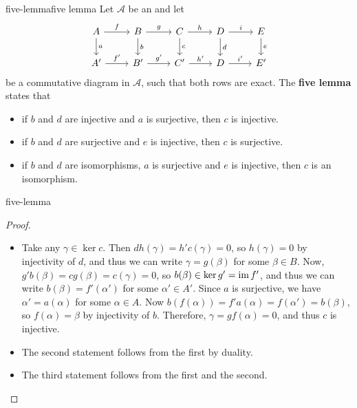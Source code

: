 \begin{topic}{five-lemma}{five lemma}
    Let $\mathcal{A}$ be an  and let
    \[ \svg \begin{tikzcd} A \arrow{r}{f} \arrow{d}{a} & B \arrow{r}{g} \arrow{d}{b} & C \arrow{r}{h} \arrow{d}{c} & D \arrow{r}{i} \arrow{d}{d} & E \arrow{d}{e} \\ A' \arrow{r}{f'} & B' \arrow{r}{g'} & C' \arrow{r}{h'} & D \arrow{r}{i'} & E' \end{tikzcd} \]
    be a commutative diagram in $\mathcal{A}$, such that both rows are exact. The \textbf{five lemma} states that
    \begin{itemize}
        \item if $b$ and $d$ are injective and $a$ is surjective, then $c$ is injective.
        \item if $b$ and $d$ are surjective and $e$ is injective, then $c$ is surjective.
        \item if $b$ and $d$ are isomorphisms, $a$ is surjective and $e$ is injective, then $c$ is an isomorphism.
    \end{itemize}
\end{topic}

\begin{example}{five-lemma}
    \begin{proof}
        \begin{itemize}
            \item Take any $\gamma \in \ker c$. Then $dh(\gamma) = h'c(\gamma) = 0$, so $h(\gamma) = 0$ by injectivity of $d$, and thus we can write $\gamma = g(\beta)$ for some $\beta \in B$. Now, $g'b(\beta) = cg(\beta) = c(\gamma) = 0$, so $b(\beta) \in \ker g' = \operatorname{im} f'$, and thus we can write $b(\beta) = f'(\alpha')$ for some $\alpha' \in A'$. Since $a$ is surjective, we have $\alpha' = a(\alpha)$ for some $\alpha \in A$. Now $b(f(\alpha)) = f'a(\alpha) = f(\alpha') = b(\beta)$, so $f(\alpha) = \beta$ by injectivity of $b$. Therefore, $\gamma = gf(\alpha) = 0$, and thus $c$ is injective.
            \item The second statement follows from the first by duality.
            \item The third statement follows from the first and the second.
        \end{itemize}
    \end{proof}
\end{example}

